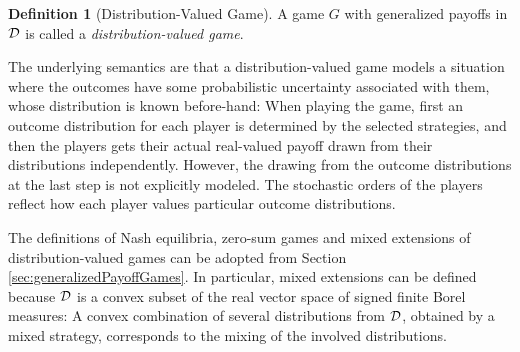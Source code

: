 \documentclass[a4paper,DIV=11]{scrreprt}
\theoremstyle{definition}
\newtheorem{defn}[thm]{Definition} %
\begin{document}
    \begin{defn}[Distribution-Valued Game]
        A game $G$ with generalized payoffs in $\mathcal{D}$ is called a \emph{distribution-valued game}.
        \label{def:distributionValuedGame}
    \end{defn}
    The underlying semantics are that a distribution-valued game models a situation where the outcomes have some probabilistic uncertainty associated with them, whose distribution is known before-hand: When playing the game, first an outcome distribution for each player is determined by the selected strategies, and then the players gets their actual real-valued payoff drawn from their distributions independently.
    However, the drawing from the outcome distributions at the last step is not explicitly modeled. The stochastic orders of the players reflect how each player values particular outcome distributions.

    The definitions of Nash equilibria, zero-sum games and mixed extensions of distribution-valued games can be adopted from Section \ref{sec:generalizedPayoffGames}.
    In particular, mixed extensions can be defined because $\mathcal{D}$ is a convex subset of the real vector space of signed finite Borel measures: A convex combination of several distributions from $\mathcal{D}$, obtained by a mixed strategy, corresponds to the mixing of the involved distributions.
    
\end{document}

